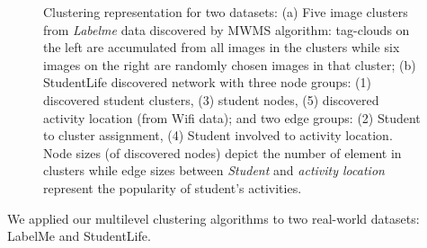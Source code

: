 \begin{figure}[t]
\begin{centering}
{}\qquad{}
\par\end{centering}

\caption{
Clustering representation for two datasets: (a) Five image clusters
from \emph{Labelme} data discovered by MWMS algorithm: tag-clouds
on the left are accumulated from all images in the clusters while
six images on the right are randomly chosen images in that cluster;
(b) StudentLife discovered network with three node groups: (1) discovered
student clusters, (3) student nodes, (5) discovered activity location
(from Wifi data); and two edge groups: (2) Student to cluster assignment,
(4) Student involved to activity location. Node sizes (of discovered
nodes) depict the number of element in clusters while edge sizes between
\emph{Student} and \emph{activity location }represent the popularity
of student's activities.
}
\end{figure}

We applied our multilevel clustering algorithms to two real-world datasets: LabelMe and StudentLife.

